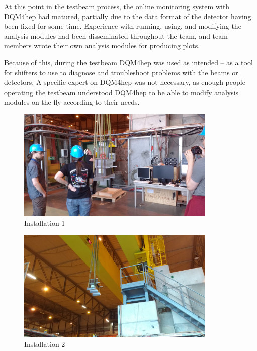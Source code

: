 At this point in the testbeam process, the online monitoring system with \acrshort{DQM4hep} had matured, partially due to the data format of the detector having been fixed for some time. Experience with running, using, and modifying the analysis modules had been disseminated throughout the team, and team members wrote their own analysis modules for producing plots.

Because of this, during the testbeam \acrshort{DQM4hep} was used as intended -- as a tool for shifters to use to diagnose and troubleshoot problems with the beams or detectors. A specific expert on \acrshort{DQM4hep} was not necessary, as enough people operating the testbeam understood \acrshort{DQM4hep} to be able to modify analysis modules on the fly according to their needs.


%

\begin{figure}[p]
	\centering
	\includegraphics[width=0.85\textwidth]{../Pictures/AHCAL-CERN-2017-Installation-1.jpg}
	\caption{Installation 1}
	\label{figure:aida/may2017/installation-1}
\end{figure}

\begin{figure}[p]
	\centering
	\includegraphics[width=0.85\textwidth]{../Pictures/AHCAL-CERN-2017-Installation-2.jpg}
	\caption{Installation 2}
	\label{figure:aida/may2017/installation-2}
\end{figure}

